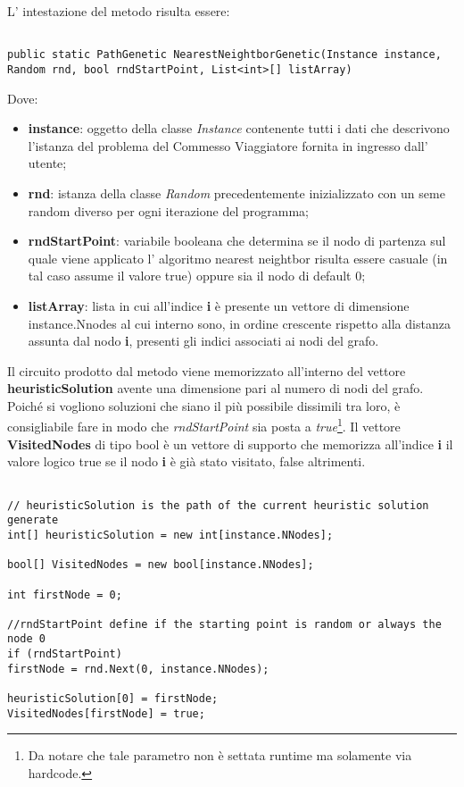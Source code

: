 \documentclass[11pt]{article}
\begin{document}
L' intestazione del metodo risulta essere:

\begin{lstlisting}

public static PathGenetic NearestNeightborGenetic(Instance instance, Random rnd, bool rndStartPoint, List<int>[] listArray)

\end{lstlisting}


Dove:


\begin{itemize}
    \item \textbf{instance}: oggetto della classe \textit{Instance} contenente tutti i dati che descrivono l'istanza del problema del Commesso Viaggiatore fornita in ingresso dall' utente;
    \item \textbf{rnd}: istanza della classe \textit{Random} precedentemente inizializzato con un seme random diverso per ogni iterazione del programma;
    \item \textbf{rndStartPoint}: variabile booleana che determina se il nodo di partenza sul quale viene applicato l' algoritmo nearest neightbor risulta essere casuale (in tal caso assume il valore true) oppure sia il nodo di default 0;
    \item \textbf{listArray}: lista in cui all'indice \textbf{i} è presente un vettore di dimensione instance.Nnodes al cui interno sono, in ordine crescente rispetto alla distanza assunta dal nodo \textbf{i}, presenti gli indici associati ai nodi del grafo.
\end{itemize}

Il circuito prodotto dal metodo viene memorizzato all'interno del vettore \textbf{heuristicSolution} avente una dimensione pari al numero di nodi del grafo. Poiché si vogliono soluzioni che siano il più possibile dissimili tra loro, è consigliabile fare in modo che \textit{rndStartPoint} sia posta a \textit{true}\footnote{Da notare che tale parametro non è settata runtime ma solamente via hardcode.}. Il vettore \textbf{VisitedNodes} di tipo bool è un vettore di supporto che memorizza all'indice \textbf{i} il valore logico true se il nodo \textbf{i} è già stato visitato, false altrimenti.

\begin{lstlisting}

// heuristicSolution is the path of the current heuristic solution generate
int[] heuristicSolution = new int[instance.NNodes];

bool[] VisitedNodes = new bool[instance.NNodes];

int firstNode = 0;

//rndStartPoint define if the starting point is random or always the node 0 
if (rndStartPoint)
firstNode = rnd.Next(0, instance.NNodes);

heuristicSolution[0] = firstNode;
VisitedNodes[firstNode] = true;

\end{lstlisting}
\end{document}
